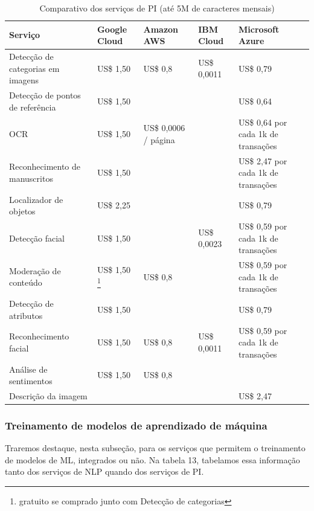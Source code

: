 \documentclass{article}
\begin{document}
\begin{table}[!!ht]
 \caption{Comparativo dos serviços de PI (até 5M de caracteres mensais)}
  \centering
  \begin{tabular}{lllll}
    \cmidrule(r){1-5}
    Serviço & Google Cloud & Amazon AWS & IBM Cloud & Microsoft Azure \\
    \midrule
    Detecção de categorias em imagens & US\$ 1,50 & US\$ 0,8 & US\$ 0,0011 & US\$ 0,79 \\ %
    Detecção de pontos de referência & US\$ 1,50 & & & US\$ 0,64 \\
    OCR & US\$ 1,50 & US\$ 0,0006 / página & & US\$ 0,64 por cada 1k de transações \\ %
    Reconhecimento de manuscritos & US\$ 1,50 & & & US\$ 2,47 por cada 1k de transações \\ %
    Localizador de objetos & US\$ 2,25 & & & US\$ 0,79 \\
    Detecção facial & US\$ 1,50 & & US\$ 0,0023 & US\$ 0,59 por cada 1k de transações \\ %
    Moderação de conteúdo & US\$ 1,50 \footnote{gratuito se comprado junto com Detecção de categorias}& US\$ 0,8 & & US\$ 0,59 por cada 1k de transações \\
    Detecção de atributos & US\$ 1,50 & & & US\$ 0,79 \\
    Reconhecimento facial & US\$ 1,50 & US\$ 0,8 & US\$ 0,0011 & US\$ 0,59 por cada 1k de transações \\ %
    Análise de sentimentos & US\$ 1,50 & US\$ 0,8 & & \\
    Descrição da imagem & & & & US\$ 2,47 \\
    \bottomrule
  \end{tabular}
  \label{tab:table14}
\end{table}

\subsubsection{Treinamento de modelos de aprendizado de máquina}
Traremos destaque, nesta subseção, para os serviços que permitem o treinamento de modelos de ML, integrados ou não. Na tabela 13, tabelamos essa informação tanto dos serviços de NLP quando dos serviços de PI.
\end{document}
